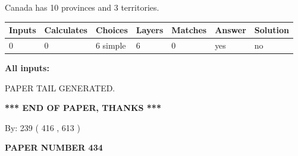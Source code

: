 \documentclass[12pt]{article}
\begin{document}
 
\noindent{}
 
 
Canada has 10  provinces and 3 territories.
 
 
\noindent{}
 
 
   
   
   
   
\noindent\begin{tabular}{|l|l|l|l|l|l|l|}
 \hline
Inputs & Calculates & Choices & Layers & Matches & Answer & Solution \\ \hline
 0  & 
 0  & 
 6
  simple  
  & 
 6  & 
 0  & 
  yes & 
  no 
  \\ \hline
 \end{tabular}
   
   
   
   
\noindent{}
   
   
   
   
\noindent\vspace{0.1in}\hspace{-0.08in} {\textbf{\Large{All inputs: }}}
   
   
   
   
   
   
 \vspace{0.2in}
 
   
   
\vspace{2.0in} PAPER TAIL GENERATED.
   
   
   
   
\vspace{1.0in} 
{\textbf{\large{ *** END OF PAPER, THANKS *** }}} 
   
   
\hspace{1.0in} By: 
 239 ( 416 ,  613 )
   
   
   
   
\newpage 
\setcounter{page}{ 
   434001 } 
   
   
   
   
 {\textbf{ \Large{ PAPER NUMBER  434  }}}
   
   
\vspace{0.2in}
   
   
   
\end{document}
